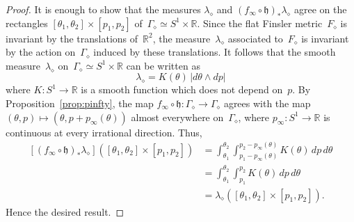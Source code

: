 \documentclass[AHL,Unicode,longabstracts,published]{cedram}
\newcommand{\R}{\mathbb{R}}
\newcommand{\bh}{\mathfrak{h}}
\begin{document}
\begin{proof}
It is enough to show that the measures $\lambda_\diamond$ and $(f_\infty \circ \bh)_* \lambda_\diamond$ agree on the rectangles $[\theta_1,\theta_2] \times [p_1,p_2]$ of~$\Gamma_\diamond \simeq S^1 \times \R$. Since the flat Finsler metric~$F_\diamond$ is invariant by the translations of~$\R^2$, the measure~$\lambda_\diamond$ associated to~$F_\diamond$ is invariant by the action on~$\Gamma_\diamond$ induced by these translations. It follows that the smooth measure~$\lambda_\diamond$ on~$\Gamma_\diamond \simeq S^1 \times \R$ can be written as
\[
\lambda_\diamond = K(\theta) \, |d\theta \wedge dp|
\]
where $K:S^1 \to \R$ is a smooth function which does not depend on~$p$. By Proposition~\ref{prop:pinfty}, the map $f_\infty \circ \bh: \Gamma_\diamond \to \Gamma_\diamond$ agrees with the map $(\theta,p) \mapsto (\theta,p+p_\infty(\theta))$ almost everywhere on~$\Gamma_\diamond$, where $p_\infty:S^1 \to \R$ is continuous at every irrational direction. Thus,
\begin{align*}
\left[(f_\infty \circ \bh)_* \lambda_\diamond\right]\left([\theta_1,\theta_2] \times [p_1,p_2]\right) & = \int_{\theta_1}^{\theta_2} \int_{p_1-p_\infty(\theta)}^{p_2-p_\infty(\theta)} K(\theta) \, dp \, d\theta \\
& = \int_{\theta_1}^{\theta_2} \int_{p_1}^{p_2} K(\theta) \, dp \, d\theta \\
& = \lambda_\diamond\left([\theta_1,\theta_2] \times [p_1,p_2]\right).
\end{align*}
Hence the desired result.
\end{proof}
\end{document}
